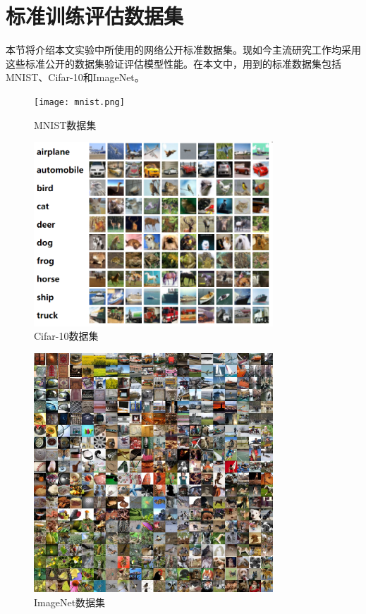 \section{标准训练评估数据集}

本节将介绍本文实验中所使用的网络公开标准数据集。现如今主流研究工作均采用这些标准公开的数据集验证评估模型性能。在本文中，用到的标准数据集包括MNIST、Cifar-10和ImageNet。

\begin{figure}[]
    \centering
    \texttt{[image: mnist.png]}	%
    \caption{MNIST数据集}
    \label{fig:mnist} %
\end{figure}

\begin{figure}[]
    \centering
    \includegraphics[width=0.8\textwidth]{cifar10.png}	%
    \caption{Cifar-10数据集}
    \label{fig:cifar10} %
\end{figure}

\begin{figure}[]
    \centering
    \includegraphics[width=0.8\textwidth]{figures/imagenet.jpg}	%
    \caption{ImageNet数据集}
    \label{fig:imagenet} %
\end{figure}

